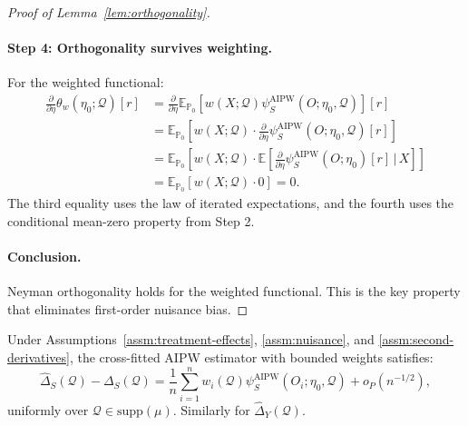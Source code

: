 \begin{proof}[Proof of Lemma~\ref{lem:orthogonality}]
\paragraph{Step 4: Orthogonality survives weighting.}
For the weighted functional:
\begin{align}
\frac{\partial}{\partial\eta}\theta_w(\eta_0; \mathcal{Q})[r] &= \frac{\partial}{\partial\eta}\mathbb{E}_{\mathbb{P}_0}\left[w(X; \mathcal{Q}) \psi_S^{\text{AIPW}}(O; \eta_0, \mathcal{Q})\right][r] \\
&= \mathbb{E}_{\mathbb{P}_0}\left[w(X; \mathcal{Q}) \cdot \frac{\partial}{\partial\eta}\psi_S^{\text{AIPW}}(O; \eta_0, \mathcal{Q})[r]\right] \\
&= \mathbb{E}_{\mathbb{P}_0}\left[w(X; \mathcal{Q}) \cdot \mathbb{E}\left[\frac{\partial}{\partial\eta}\psi_S^{\text{AIPW}}(O; \eta_0)[r] \,\bigg|\, X\right]\right] \\
&= \mathbb{E}_{\mathbb{P}_0}[w(X; \mathcal{Q}) \cdot 0] = 0.
\end{align}
The third equality uses the law of iterated expectations, and the fourth uses the conditional mean-zero property from Step 2.

\paragraph{Conclusion.}
Neyman orthogonality holds for the weighted functional. This is the key property that eliminates first-order nuisance bias.
\end{proof}

\begin{lemma}
\label{lem:cross-fitting}
Under Assumptions~\ref{assm:treatment-effects}, \ref{assm:nuisance}, and \ref{assm:second-derivatives}, the cross-fitted AIPW estimator with bounded weights satisfies:
\begin{equation}
\hat{\Delta}_S(\mathcal{Q}) - \Delta_S(\mathcal{Q}) = \frac{1}{n}\sum_{i=1}^n w_i(\mathcal{Q}) \psi_S^{\text{AIPW}}(O_i; \eta_0, \mathcal{Q}) + o_P(n^{-1/2}),
\end{equation}
uniformly over $\mathcal{Q} \in \text{supp}(\mu)$. Similarly for $\hat{\Delta}_Y(\mathcal{Q})$.
\end{lemma}

